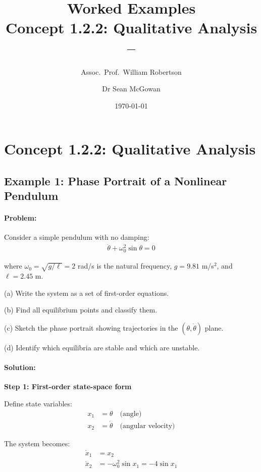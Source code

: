 \documentclass[11pt,a4paper]{article}
\title{\textbf{Worked Examples}\\[0.5em]
\large Concept 1.2.2: Qualitative Analysis\\[0.3em]
\normalsize \coursesubtitle{} -- \coursetitle}
\author{Assoc.\ Prof.\ William Robertson \and Dr Sean McGowan}
\date{\today}
\begin{document}
\maketitle
\tableofcontents
\newpage

\section{Concept 1.2.2: Qualitative Analysis}

\subsection{Example 1: Phase Portrait of a Nonlinear Pendulum}

\paragraph{Problem:} Consider a simple pendulum with no damping:
\begin{align}
  \ddot{\theta} + \omega_0^2 \sin\theta = 0
\end{align}

where $\omega_0 = \sqrt{g/\ell} = 2$ rad/s is the natural frequency, $g = 9.81$ m/s$^2$, and $\ell = 2.45$ m.

(a) Write the system as a set of first-order equations.

(b) Find all equilibrium points and classify them.

(c) Sketch the phase portrait showing trajectories in the $(\theta, \dot{\theta})$ plane.

(d) Identify which equilibria are stable and which are unstable.

\paragraph{Solution:}

\textbf{Step 1: First-order state-space form}

Define state variables:
\begin{align}
  x_1 &= \theta \quad \text{(angle)} \\
  x_2 &= \dot{\theta} \quad \text{(angular velocity)}
\end{align}

The system becomes:
\begin{align}
  \dot{x}_1 &= x_2 \\
  \dot{x}_2 &= -\omega_0^2 \sin x_1 = -4\sin x_1
\end{align}
\end{document}
